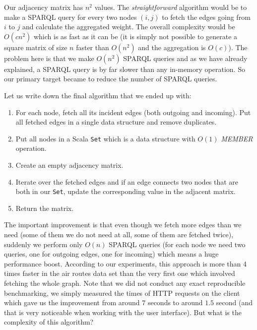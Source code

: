 Our adjacency matrix has $n^2$ values. The \emph{straightforward} algorithm would be to make a SPARQL query for every two nodes $(i, j)$ to fetch the edges going from $i$ to $j$ and calculate the aggregated weight. The overall complexity would be $O(cn^2)$ which is as fast as it can be (it is simply not possible to generate a square matrix of size $n$ faster than $O(n^2)$  and the aggregation is $O(c)$). The problem here is that we make $O(n^2)$ SPARQL queries and as we have already explained, a SPARQL query is by far slower than any in-memory operation. So our primary target became to reduce the number of SPARQL queries.

Let us write down the final algorithm that we ended up with:

\begin{enumerate}
\item For each node, fetch all its incident edges (both outgoing and incoming). Put all fetched edges in a single data structure and remove duplicates.
\item Put all nodes in a Scala \texttt{Set} which is a data structure with $O(1)$  \emph{MEMBER} operation.
\item Create an empty adjacency matrix.
\item Iterate over the fetched edges and if an edge connects two nodes that are both in our \texttt{Set}, update the corresponding value in the adjacent matrix.
\item Return the matrix.
\end{enumerate}

The important improvement is that even though we fetch more edges than we need (some of them we do not need at all, some of them are fetched twice), suddenly we perform only $O(n)$ SPARQL queries (for each node we need two queries, one for outgoing edges, one for incoming) which means a huge performance boost. According to our experiments, this approach is more than 4 times faster in the air routes data set than the very first one which involved fetching the whole graph. Note that we did not conduct any exact reproducible benchmarking, we simply measured the times of HTTP requests on the client which gave us the improvement from around $7$ seconds to around $1.5$ second (and that is very noticeable when working with the user interface). But what is the complexity of this algorithm?

